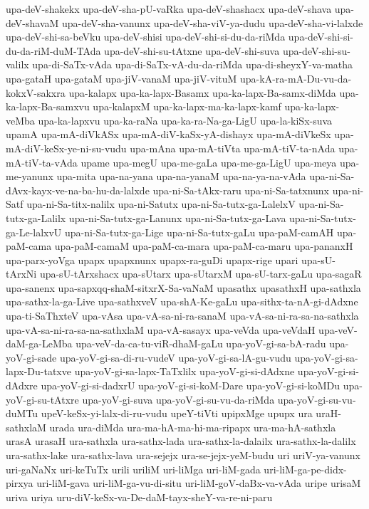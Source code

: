 {upa-deV-shakekx
upa-deV-sha-pU-vaRka
upa-deV-shashacx
upa-deV-shava
upa-deV-shavaM
upa-deV-sha-vanunx
upa-deV-sha-viV-ya-dudu
upa-deV-sha-vi-lalxde
upa-deV-shi-sa-beVku
upa-deV-shisi
upa-deV-shi-si-du-da-riMda
upa-deV-shi-si-du-da-riM-duM-TAda
upa-deV-shi-su-tAtxne
upa-deV-shi-suva
upa-deV-shi-su-valilx
upa-di-SaTx-vAda
upa-di-SaTx-vA-du-da-riMda
upa-di-sheyxY-va-matha
upa-gataH
upa-gataM
upa-jiV-vanaM
upa-jiV-vituM
upa-kA-ra-mA-Du-vu-da-kokxV-sakxra
upa-kalapx
upa-ka-lapx-Basamx
upa-ka-lapx-Ba-samx-diMda
upa-ka-lapx-Ba-samxvu
upa-kalapxM
upa-ka-lapx-ma-ka-lapx-kamf
upa-ka-lapx-veMba
upa-ka-lapxvu
upa-ka-raNa
upa-ka-ra-Na-ga-LigU
upa-la-kiSx-suva
upamA
upa-mA-diVkASx
upa-mA-diV-kaSx-yA-dishayx
upa-mA-diVkeSx
upa-mA-diV-keSx-ye-ni-su-vudu
upa-mAna
upa-mA-tiVta
upa-mA-tiV-ta-nAda
upa-mA-tiV-ta-vAda
upame
upa-megU
upa-me-gaLa
upa-me-ga-LigU
upa-meya
upa-me-yanunx
upa-mita
upa-na-yana
upa-na-yanaM
upa-na-ya-na-vAda
upa-ni-Sa-dAvx-kayx-ve-na-ba-hu-da-lalxde
upa-ni-Sa-tAkx-raru
upa-ni-Sa-tatxnunx
upa-ni-Satf
upa-ni-Sa-titx-nalilx
upa-ni-Satutx
upa-ni-Sa-tutx-ga-LalelxV
upa-ni-Sa-tutx-ga-Lalilx
upa-ni-Sa-tutx-ga-Lanunx
upa-ni-Sa-tutx-ga-Lava
upa-ni-Sa-tutx-ga-Le-lalxvU
upa-ni-Sa-tutx-ga-Lige
upa-ni-Sa-tutx-gaLu
upa-paM-camAH
upa-paM-cama
upa-paM-camaM
upa-paM-ca-mara
upa-paM-ca-maru
upa-pananxH
upa-parx-yoVga
upapx
upapxnunx
upapx-ra-guDi
upapx-rige
upari
upa-sU-tArxNi
upa-sU-tArxshacx
upa-sUtarx
upa-sUtarxM
upa-sU-tarx-gaLu
upa-sagaR
upa-sanenx
upa-sapxqq-shaM-sitxrX-Sa-vaNaM
upasathx
upasathxH
upa-sathxla
upa-sathx-la-ga-Live
upa-sathxveV
upa-shA-Ke-gaLu
upa-sithx-ta-nA-gi-dAdxne
upa-ti-SaThxteV
upa-vAsa
upa-vA-sa-ni-ra-sanaM
upa-vA-sa-ni-ra-sa-na-sathxla
upa-vA-sa-ni-ra-sa-na-sathxlaM
upa-vA-sasayx
upa-veVda
upa-veVdaH
upa-veV-daM-ga-LeMba
upa-veV-da-ca-tu-viR-dhaM-gaLu
upa-yoV-gi-sa-bA-radu
upa-yoV-gi-sade
upa-yoV-gi-sa-di-ru-vudeV
upa-yoV-gi-sa-lA-gu-vudu
upa-yoV-gi-sa-lapx-Du-tatxve
upa-yoV-gi-sa-lapx-TaTxlilx
upa-yoV-gi-si-dAdxne
upa-yoV-gi-si-dAdxre
upa-yoV-gi-si-dadxrU
upa-yoV-gi-si-koM-Dare
upa-yoV-gi-si-koMDu
upa-yoV-gi-su-tAtxre
upa-yoV-gi-suva
upa-yoV-gi-su-vu-da-riMda
upa-yoV-gi-su-vu-duMTu
upeV-keSx-yi-lalx-di-ru-vudu
upeY-tiVti
upipxMge
upupx
ura
uraH-sathxlaM
urada
ura-diMda
ura-ma-hA-ma-hi-ma-ripapx
ura-ma-hA-sathxla
urasA
urasaH
ura-sathxla
ura-sathx-lada
ura-sathx-la-dalailx
ura-sathx-la-dalilx
ura-sathx-lake
ura-sathx-lava
ura-sejejx
ura-se-jejx-yeM-budu
uri
uriV-ya-vanunx
uri-gaNaNx
uri-keTuTx
urili
uriliM
uri-liMga
uri-liM-gada
uri-liM-ga-pe-didx-pirxya
uri-liM-gava
uri-liM-ga-vu-di-situ
uri-liM-goV-daBx-va-vAda
uripe
urisaM
uriva
uriya
uru-diV-keSx-va-De-daM-tayx-sheY-va-re-ni-paru
}
